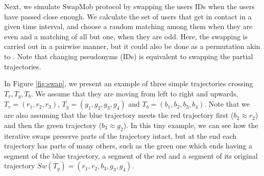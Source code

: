 Next, we simulate SwapMob protocol by swapping the users IDs when the users have passed close enough.
We calculate the set of users that get in contact in a given time interval, and choose a random matching among them when they are even and a matching of all but one, when they are odd.
Here, the swapping is carried out in a pairwise manner, but it could also be done as a permutation akin to \cite{Beresford04mixzones}.
Note that changing pseudonyms (IDs) is equivalent to swapping the partial trajectories.


\begin{figure}[!t]
\end{figure}


In Figure \ref{fig:swap}, we present an example of three simple trajectories crossing $T_r, T_g, T_b$. We assume that they are moving from left to right and upwards, $T_r = (r_1, r_2, r_3)$, $T_g = (g_1, g_2, g_3, g_4)$ and $T_b = (b_1, b_2, b_3, b_4)$. Note that we are also assuming that the blue trajectory meets the red trajectory first ($b_2 \approx r_2$) and then the green trajectory ($b_3 \approx g_2$). In this tiny example, we can see how the iterative swaps preserve parts of the trajectory intact, but at the end each trajectory has parts of many others, such as the green one which ends having a segment of the blue trajectory, a segment of the red and a segment of its original trajectory $Sw(T_g)=(r_1, r_2, b_3, g_3, g_4)$.


